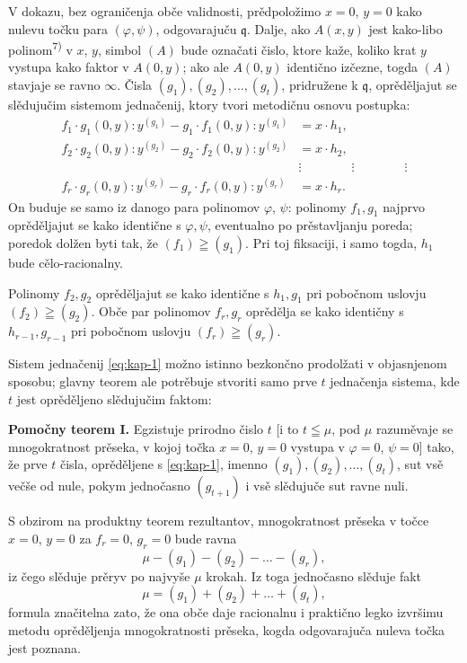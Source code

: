 \documentclass[11pt]{article}
\theoremstyle{plain}
\begin{document}
V dokazu, bez ograničenja obče validnosti, prědpoložimo $x = 0$,
$y = 0$ kako nulevu točku para $(\varphi, \psi)$, odgovarajuču
$\mathfrak{q}$. Dalje, ako $A(x,y)$ jest kako-libo polinom\textsuperscript{7)}
v $x$, $y$, simbol $(A)$ bude označati čislo, ktore kaže, koliko
krat $y$ vystupa kako faktor v $A(0,y)$; ako ale $A(0,y)$
identično izčezne, togda $(A)$ stavjaje se ravno $\infty$. Čisla
$(g_{1}), (g_{2}), \ldots, (g_{t})$, pridružene k $\mathfrak{q}$,
oprěděljajut se slědujučim sistemom jednačenij, ktory tvori
metodičnu osnovu postupka:
\begin{equation}\label{eq:kap-1}
\begin{aligned}
f_{1}\cdot g_{1}(0,y):y^{(g_{1})} - g_{1}\cdot f_{1}(0,y):y^{(g_{1})} &= x\cdot h_{1},\\
f_{2}\cdot g_{2}(0,y):y^{(g_{2})} - g_{2}\cdot f_{2}(0,y):y^{(g_{2})} &= x\cdot h_{2},\\
&\vdots \qquad\qquad\vdots\qquad\qquad\vdots\\
f_{r}\cdot g_{r}(0,y):y^{(g_{r})} - g_{r}\cdot f_{r}(0,y):y^{(g_{r})} &= x\cdot h_{r}.
\end{aligned}
\end{equation}
On buduje se samo iz danogo para polinomov $\varphi$, $\psi$:
polinomy $f_{1}, g_{1}$ najprvo oprěděljajut se kako identične s
$\varphi, \psi$, eventualno po prěstavljanju poreda; poredok
dolžen byti tak, že $(f_1)\geqq(g_1)$. Pri toj fiksaciji, i
samo togda, $h_{1}$ bude cělo-racionalny.

Polinomy $f_{2}, g_{2}$ oprěděljajut se kako identične s
$h_{1}, g_{1}$ pri pobočnom uslovju $(f_2)\geqq(g_2)$. Obče par
polinomov $f_{r}, g_{r}$ oprědělja se kako identičny s
$h_{r-1}, g_{r-1}$ pri pobočnom uslovju $(f_r)\geqq(g_r)$.

Sistem jednačenij \eqref{eq:kap-1} možno istinno bezkončno
prodolžati v objasnjenom sposobu; glavny teorem ale potrěbuje
stvoriti samo prve $t$ jednačenja sistema, kde $t$ jest oprěděljeno
slědujučim faktom:

\smallskip
\textbf{Pomočny teorem I.} Egzistuje prirodno čislo $t$ [i to
$t\leqq\mu$, pod $\mu$ razuměvaje se mnogokratnost prěseka, v kojoj
točka $x = 0$, $y = 0$ vystupa v $\varphi = 0$, $\psi = 0$] tako, že
prve $t$ čisla, oprěděljene s \eqref{eq:kap-1}, imenno
$(g_{1}), (g_{2}), \ldots, (g_{t})$, sut vsě večše od nule, pokym
jednočasno $(g_{t+1})$ i vsě slědujuče sut ravne nuli.

S obzirom na produktny teorem rezultantov, mnogokratnost
prěseka v točce $x = 0$, $y = 0$ za $f_{r} = 0$, $g_{r} = 0$ bude
ravna
\[
\mu-(g_1)-(g_2)-\ldots-(g_r),
\]
iz čego slěduje prěryv po najvyše $\mu$ krokah. Iz toga jednočasno
slěduje fakt
\begin{equation}\label{eq:kap-2}
\mu=(g_1)+(g_2)+\ldots+(g_t),
\end{equation}
formula značitelna zato, že ona obče daje racionalnu i praktično
legko izvršimu metodu oprěděljenja mnogokratnosti prěseka, kogda
odgovarajuča nuleva točka jest poznana.
\end{document}
